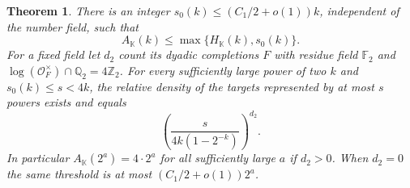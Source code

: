 \documentclass[11pt,letterpaper]{article}
\newtheorem{theorem}{Theorem}[section]
\theoremstyle{definition}
\numberwithin{equation}{section}
\begin{document}
\begin{theorem}\label{thm:nf-density-linear}
There is an integer $s_0(k)\le(C_1/2+o(1))k$, independent of the
number field, such that
\[
                 A_{\mathbb K}(k)\le\max\{H_{\mathbb K}(k),s_0(k)\}.
\]
For a fixed field let $d_2$ count its dyadic completions $F$ with
residue field $\mathbb F_2$ and
$\log(\mathcal O_F^\times)\cap\mathbb Q_2=4\mathbb Z_2$.
For every sufficiently large power of two $k$ and
$s_0(k)\le s<4k$, the relative density of the targets represented
by at most $s$ powers exists and equals
\begin{equation}\label{eq:nf-exact-density}
                   \left(\frac{s}{4k(1-2^{-k})}\right)^{d_2}.
\end{equation}
In particular $A_{\mathbb K}(2^a)=4\cdot2^a$ for all sufficiently
large $a$ if $d_2>0$. When $d_2=0$ the same threshold is at most
$(C_1/2+o(1))2^a$.
\end{theorem}
\end{document}

